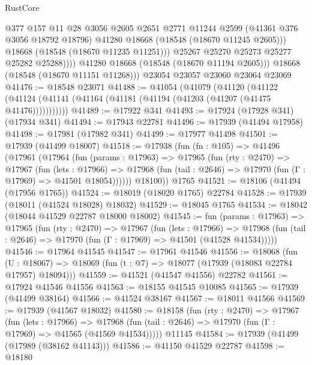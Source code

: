 \begin{lexlean}{RustCore}
\begin{coremodule}
                    @377
                    @157
                    @11
                    @28
                    @3056
                    @2605
                    @2651
                    @2771
                    @11244
                    @2599
                    (@41361 @376 @3056 @18792 @18796)
                    @41280
                    @18668
                    (@18548 (@18670 @11245 @2605)))
                  @18668
                  (@18548 (@18670 @11235 @11251)))
                @25267
                @25270
                @25273
                @25277
                @25282
                @25288))))
        @41280
        @18668
        (@18548 (@18670 @11194 @2605)))
      @18668
      (@18548 (@18670 @11151 @11268)))
    @23054
    @23057
    @23060
    @23064
    @23069
@41476 := @18548 @23071
@41488 := @41054
    (@41079
      (@41120
        (@41122 (@41124 (@41141 (@41164 (@41181 (@41194 (@41203 (@41207 (@41475 @41476)))))))))))
@41489 := @17922 @341
@41493 := @17924 (@17928 @341) (@17934 @341)
@41494 := @17943 @22781
@41496 := @17939 (@41494 @17958)
@41498 := @17981 (@17982 @341)
@41499 := @17977 @41498
@41501 := @17939 (@41499 @18007)
@41518 := @17938
    (fun (fn : @105) =>
    @41496
      (@17961
        (@17964
          (fun (params : @17963) =>
          @17965
            (fun (rty : @2470) =>
            @17967
              (fun (lets : @17966) =>
              @17968 (fun (tail : @2646) => @17970 (fun (Γ : @17969) => @41501 @18054))))))
        @18100))
    @1765
@41521 := @18106 (@41494 (@17956 @1765))
@41524 := @18019 (@18020 @1765) @22784
@41528 := @17939 (@18011 (@41524 @18028) @18032)
@41529 := @18045 @1765
@41534 := @18042 (@18044 @41529 @22787 @18000 @18002)
@41545 := fun (params : @17963) =>
  @17965
    (fun (rty : @2470) =>
    @17967
      (fun (lets : @17966) =>
      @17968 (fun (tail : @2646) => @17970 (fun (Γ : @17969) => @41501 (@41528 @41534)))))
@41546 := @17964 @41545
@41547 := @17961 @41546
@41556 := @18068
    (fun (U : @18067) => @18069 (fun (t : @7) => @18077 (@17939 (@18083 @22784 @17957) @18094)))
@41559 := @41521 (@41547 @41556) @22782
@41561 := @17924 @41546 @41556
@41563 := @18155 @41545 @10085
@41565 := @17939 (@41499 @38164)
@41566 := @41524 @38167
@41567 := @18011 @41566
@41569 := @17939 (@41567 @18032)
@41580 := @18158
    (fun (rty : @2470) =>
    @17967
      (fun (lets : @17966) =>
      @17968 (fun (tail : @2646) => @17970 (fun (Γ : @17969) => @41565 (@41569 @41534)))))
    @11145
@41584 := @17939 (@41499 (@17989 (@38162 @41143)))
@41586 := @41150 @41529 @22787
@41598 := @18180

\end{coremodule}
\end{lexlean}
